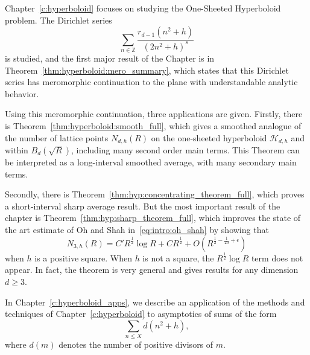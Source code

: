 Chapter~\ref{c:hyperboloid} focuses on studying the One-Sheeted Hyperboloid problem.
The Dirichlet series
\begin{equation}
  \sum_{n \in \mathbb{Z}} \frac{r_{d-1}(n^2 + h)}{(2n^2 + h)^s}
\end{equation}
is studied, and the first major result of the Chapter is in
Theorem~\ref{thm:hyperboloid:mero_summary}, which states that this Dirichlet series has
meromorphic continuation to the plane with understandable analytic behavior.

Using this meromorphic continuation, three applications are given.
Firstly, there is Theorem~\ref{thm:hyperboloid:smooth_full}, which gives a smoothed
analogue of the number of lattice points $N_{d,h}(R)$ on the one-sheeted hyperboloid
$\mathcal{H}_{d,h}$ and within $B_d(\sqrt R)$, including many second order main terms.
This Theorem can be interpreted as a long-interval smoothed average, with many secondary
main terms.


Secondly, there is Theorem~\ref{thm:hyp:concentrating_theorem_full}, which proves a
short-interval sharp average result.
But the most important result of the chapter is Theorem~\ref{thm:hyp:sharp_theorem_full},
which improves the state of the art estimate of Oh and Shah in~\eqref{eq:intro:oh_shah} by
showing that
\begin{equation}
  N_{3,h}(R) = C' R^{\frac{1}{2}} \log R + C R^{\frac{1}{2}} + O(R^{\frac{1}{2} -
  \frac{1}{20} + \epsilon})
\end{equation}
when $h$ is a positive square.
When $h$ is not a square, the $R^{\frac{1}{2}} \log R$ term does not appear.
In fact, the theorem is very general and gives results for any dimension $d \geq 3$.


In Chapter~\ref{c:hyperboloid_apps}, we describe an application of the methods and
techniques of Chapter~\ref{c:hyperboloid} to asymptotics of sums of the form
\begin{equation}
  \sum_{n \leq X} d(n^2 + h),
\end{equation}
where $d(m)$ denotes the number of positive divisors of $m$.


